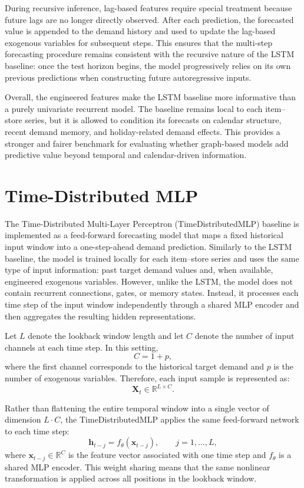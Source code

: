 During recursive inference, lag-based features require special treatment because future lags are no longer directly observed. After each prediction, the forecasted value is appended to the demand history and used to update the lag-based exogenous variables for subsequent steps. This ensures that the multi-step forecasting procedure remains consistent with the recursive nature of the LSTM baseline: once the test horizon begins, the model progressively relies on its own previous predictions when constructing future autoregressive inputs.

Overall, the engineered features make the LSTM baseline more informative than a purely univariate recurrent model. The baseline remains local to each item--store series, but it is allowed to condition its forecasts on calendar structure, recent demand memory, and holiday-related demand effects. This provides a stronger and fairer benchmark for evaluating whether graph-based models add predictive value beyond temporal and calendar-driven information.

\section{Time-Distributed MLP}

The Time-Distributed Multi-Layer Perceptron (TimeDistributedMLP) baseline is implemented as a feed-forward forecasting model that maps a fixed historical input window into a one-step-ahead demand prediction. Similarly to the LSTM baseline, the model is trained locally for each item--store series and uses the same type of input information: past target demand values and, when available, engineered exogenous variables. However, unlike the LSTM, the model does not contain recurrent connections, gates, or memory states. Instead, it processes each time step of the input window independently through a shared MLP encoder and then aggregates the resulting hidden representations.

Let \(L\) denote the lookback window length and let \(C\) denote the number of input channels at each time step. In this setting,
\[
C = 1 + p,
\]
where the first channel corresponds to the historical target demand and \(p\) is the number of exogenous variables. Therefore, each input sample is represented as:
\[
\mathbf{X}_t \in \mathbb{R}^{L \times C}.
\]

Rather than flattening the entire temporal window into a single vector of dimension \(L \cdot C\), the TimeDistributedMLP applies the same feed-forward network to each time step:
\[
\mathbf{h}_{t-j} = f_{\theta}(\mathbf{x}_{t-j}), 
\qquad j = 1,\ldots,L,
\]
where \(\mathbf{x}_{t-j} \in \mathbb{R}^{C}\) is the feature vector associated with one time step and \(f_{\theta}\) is a shared MLP encoder. This weight sharing means that the same nonlinear transformation is applied across all positions in the lookback window.


